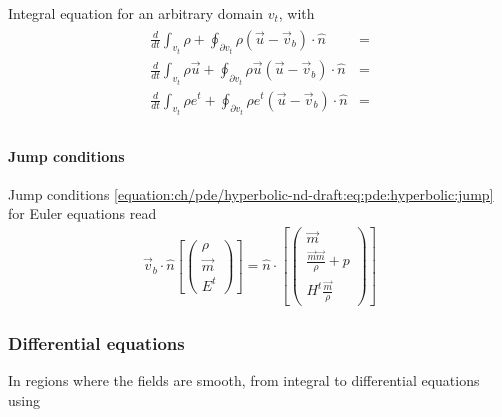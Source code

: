 \documentclass[letterpaper,10pt,english]{jupyterBook}
\begin{document}
\sphinxAtStartPar
Integral equation for an arbitrary domain \(v_t\), with {\hyperref[\detokenize{ch/tensor-algebra-calculus/time-derivative-of-integrals:tensor-calculus-time-derivative-of-integrals-volume-density}]{}}
\begin{equation*}
\begin{split}\begin{aligned}
  \frac{d}{dt} \int_{v_t} \rho         + \oint_{\partial v_t} \rho         ( \vec{u} - \vec{v}_b ) \cdot \hat{n} & = \\
  \frac{d}{dt} \int_{v_t} \rho \vec{u} + \oint_{\partial v_t} \rho \vec{u} ( \vec{u} - \vec{v}_b ) \cdot \hat{n} & = \\
  \frac{d}{dt} \int_{v_t} \rho e^t     + \oint_{\partial v_t} \rho e^t     ( \vec{u} - \vec{v}_b ) \cdot \hat{n} & = \\
\end{aligned}\end{split}
\end{equation*}

\paragraph{Jump conditions}
\label{\detokenize{ch/pde/hyperbolic-nd-euler:jump-conditions}}\label{\detokenize{ch/pde/hyperbolic-nd-euler:pde-hyperbolic-nd-euler-integral-jump}}
\sphinxAtStartPar
Jump conditions \eqref{equation:ch/pde/hyperbolic-nd-draft:eq:pde:hyperbolic:jump} for Euler equations read
\begin{equation}\label{equation:ch/pde/hyperbolic-nd-euler:eq:pde:hyperbolic:jump:euler}
\begin{split}
  \vec{v}_b \cdot \hat{n} \left[ \left( \begin{matrix} \rho \\ \vec{m} \\ E^t \end{matrix} \right) \right] = \hat{n} \cdot \left[ \left( \begin{matrix} \vec{m} \\\frac{\vec{m} \vec{m}}{\rho} + p \\ H^t \frac{\vec{m}}{\rho} \end{matrix} \right) \right]
\end{split}
\end{equation}

\subsubsection{Differential equations}
\label{\detokenize{ch/pde/hyperbolic-nd-euler:differential-equations}}\label{\detokenize{ch/pde/hyperbolic-nd-euler:pde-hyperbolic-nd-euler-differential}}
\sphinxAtStartPar
In regions where the fields are smooth, from integral to differential equations using {\hyperref[\detokenize{ch/tensor-algebra-calculus/calculus-euclidean:tensor-calculus-integrals-theorems}]{}}
\end{document}
